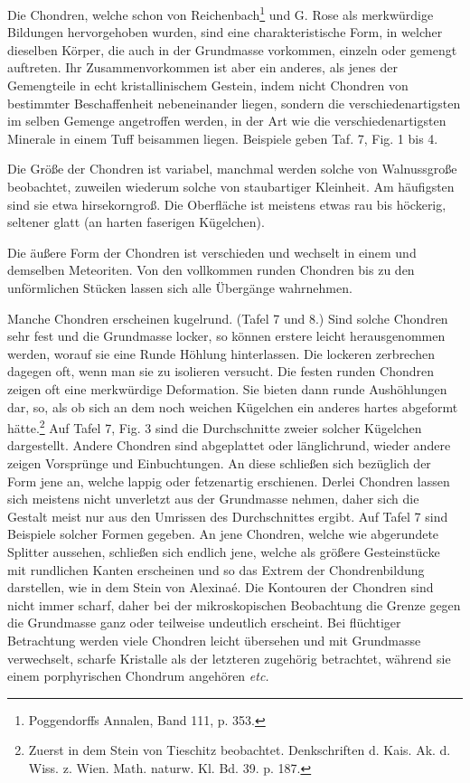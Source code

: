 \documentclass[a4paper, 12pt, oneside]{article}
\begin{document}
Die Chondren, welche schon von Reichenbach\footnote{Poggendorffs Annalen, Band 111, p. 353.} und G. Rose als merkwürdige Bildungen hervorgehoben wurden, sind eine charakteristische Form, in welcher dieselben Körper, die auch in der Grundmasse vorkommen, einzeln oder gemengt auftreten. Ihr Zusammenvorkommen ist aber ein anderes, als jenes der Gemengteile in echt kristallinischem Gestein, indem nicht Chondren von bestimmter Beschaffenheit nebeneinander liegen, sondern die verschiedenartigsten im selben Gemenge angetroffen werden, in der Art wie die verschiedenartigsten Minerale in einem Tuff beisammen liegen. Beispiele geben Taf. 7, Fig. 1 bis 4.

Die Größe der Chondren ist variabel, manchmal werden solche von Walnussgroße beobachtet, zuweilen wiederum solche von staubartiger Kleinheit. Am häufigsten sind sie etwa hirsekorngroß. Die Oberfläche ist meistens etwas rau bis höckerig, seltener glatt (an harten faserigen Kügelchen).

Die äußere Form der Chondren ist verschieden und wechselt in einem und demselben Meteoriten. Von den vollkommen runden Chondren bis zu den unförmlichen Stücken lassen sich alle Übergänge wahrnehmen.

Manche Chondren erscheinen kugelrund. (Tafel 7 und 8.) Sind solche Chondren sehr fest und die Grundmasse locker, so können erstere leicht herausgenommen werden, worauf sie eine Runde Höhlung hinterlassen. Die lockeren zerbrechen dagegen oft, wenn man sie zu isolieren versucht. Die festen runden Chondren zeigen oft eine merkwürdige Deformation. Sie bieten dann runde Aushöhlungen dar, so, als ob sich an dem noch weichen Kügelchen ein anderes hartes abgeformt hätte.\footnote{Zuerst in dem Stein von Tieschitz beobachtet. Denkschriften d. Kais. Ak. d. Wiss. z. Wien. Math. naturw. Kl. Bd. 39. p. 187.} Auf Tafel 7, Fig. 3 sind die Durchschnitte zweier solcher Kügelchen dargestellt. Andere Chondren sind abgeplattet oder länglichrund, wieder andere zeigen Vorsprünge und Einbuchtungen. An diese schließen sich bezüglich der Form jene an, welche lappig oder fetzenartig erschienen. Derlei Chondren lassen sich meistens nicht unverletzt aus der Grundmasse nehmen, daher sich die Gestalt meist nur aus den Umrissen des Durchschnittes ergibt. Auf Tafel 7 sind Beispiele solcher Formen gegeben. An jene Chondren, welche wie abgerundete Splitter aussehen, schließen sich endlich jene, welche als größere Gesteinstücke mit rundlichen Kanten erscheinen und so das Extrem der Chondrenbildung darstellen, wie in dem Stein von Alexinaé. Die Kontouren der Chondren sind nicht immer scharf, daher bei der mikroskopischen Beobachtung die Grenze gegen die Grundmasse ganz oder teilweise undeutlich erscheint. Bei flüchtiger Betrachtung werden viele Chondren leicht übersehen und mit Grundmasse verwechselt, scharfe Kristalle als der letzteren zugehörig betrachtet, während sie einem porphyrischen Chondrum angehören \emph{etc.}
\end{document}

